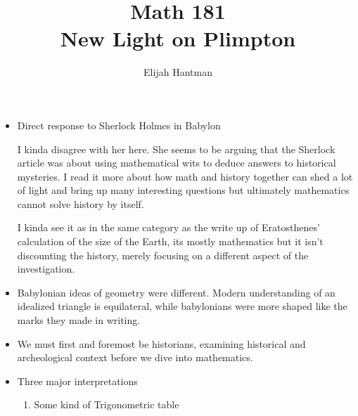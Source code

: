\documentclass{report}
\title{\Huge{Math 181}\\New Light on Plimpton}
\author{\huge{Elijah Hantman}}
\date{}
\begin{document}
\maketitle
\newpage

\begin{itemize}
    \item Direct response to Sherlock Holmes in Babylon
        \begin{mdframed}
            I kinda disagree with her here.
            She seems to be arguing that
            the Sherlock article was about using
            mathematical wits to deduce answers to
            historical mysteries. I read it more
            about how math and history together
            can shed a lot of light and bring up many
            interesting questions but ultimately
            mathematics cannot solve history by itself.

            I kinda see it as in the same category as the
            write up of Eratosthenes' calculation of the
            size of the Earth, its mostly mathematics
            but it isn't discounting the history, merely
            focusing on a different aspect of the
            investigation.
        \end{mdframed}
    \item Babylonian ideas of geometry were different. Modern
        understanding of an idealized triangle is equilateral,
        while babylonians were more shaped like the marks
        they made in writing.
    \item We must first and foremost be historians, examining
        historical and archeological context before we
        dive into mathematics.
    \item Three major interpretations
        \begin{enumerate}
            \item Some kind of Trigonometric table


\end{enumerate}
\end{itemize}
\end{document}
